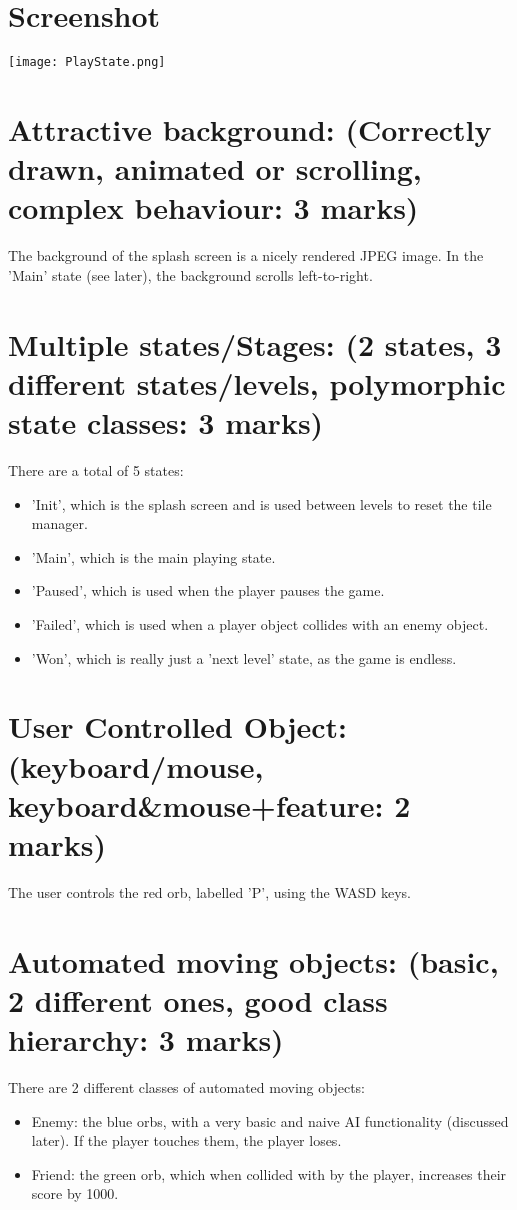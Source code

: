 \documentclass[10pt]{report}
\date{}
\begin{document}
\section{Screenshot}
\texttt{[image: PlayState.png]}
\section{Attractive background: (Correctly drawn, animated or scrolling, complex behaviour: 3 marks)}
The background of the splash screen is a nicely rendered JPEG image.
In the 'Main' state (see later), the background scrolls left-to-right.
\vspace{5cm}
\section{Multiple states/Stages: (2 states, 3 different states/levels, polymorphic state classes: 3 marks)}
There are a total of 5 states: 
\begin{itemize}
  \item'Init', which is the splash screen and is used between levels to reset the tile manager.
  \item'Main', which is the main playing state.
  \item'Paused', which is used when the player pauses the game.
  \item'Failed', which is used when a player object collides with an enemy object.
  \item'Won', which is really just a 'next level' state, as the game is endless.
\end{itemize}
\vspace{5cm}
\section{User Controlled Object: (keyboard/mouse, keyboard\&mouse+feature: 2 marks)}
The user controls the red orb, labelled 'P', using the WASD keys.
\vspace{5cm}
\section{Automated moving objects: (basic, 2 different ones, good class hierarchy: 3 marks)}
There are 2 different classes of automated moving objects:
\begin{itemize}
  \item Enemy: the blue orbs, with a very basic and naive AI functionality (discussed later). If the player touches them,
    the player loses.
  \item Friend: the green orb, which when collided with by the player, increases their score by 1000.
\end{itemize}
\vspace{5cm}
\end{document}
